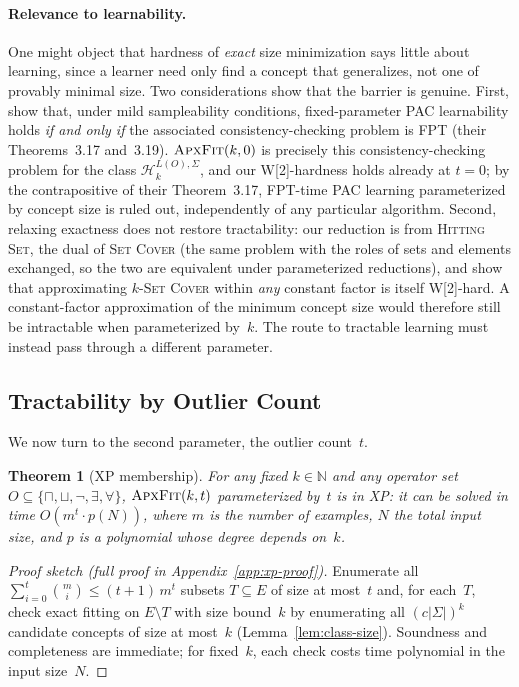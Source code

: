 \documentclass[accepted]{uai2026} %
\newtheorem{theorem}{Theorem}[section]
\theoremstyle{definition}
\theoremstyle{remark}
\newcommand{\AF}{\textsc{ApxFit}}
\begin{document}
\paragraph{Relevance to learnability.}
One might object that hardness of \emph{exact} size minimization
says little about learning, since a learner need only find a
concept that generalizes, not one of provably minimal size.
Two considerations show that the barrier is genuine.
First, \citet{DBLP:conf/aaai/BrandGS23} show
that, under mild sampleability conditions, fixed-parameter PAC
learnability holds \emph{if and only if} the associated consistency-checking problem is
FPT (their Theorems~3.17 and~3.19). $\AF(k,0)$ is precisely this
consistency-checking problem for the class
$\mathcal{H}_k^{L(O),\Sigma}$, and our W[2]-hardness holds already
at $t = 0$; by the contrapositive of their Theorem~3.17, FPT-time PAC
learning parameterized by concept size is ruled out, independently
of any particular algorithm.
Second, relaxing exactness does not restore tractability: our
reduction is from \textsc{Hitting Set}, the
dual of \textsc{Set Cover} (the same problem with the roles of
sets and elements exchanged, so the two are equivalent under
parameterized reductions), and \citet{DBLP:conf/soda/LinRSW23} show that
approximating $k$-\textsc{Set Cover} within \emph{any} constant
factor is itself W[2]-hard. A constant-factor approximation of the
minimum concept size would therefore still be intractable when
parameterized by~$k$. The route to tractable learning must
instead pass through a different parameter.

\subsection{Tractability by Outlier Count}\label{sec:complexity:xp}

We now turn to the second parameter, the
outlier count~$t$.

\begin{theorem}[XP membership]\label{thm:xp}  For any fixed $k \in \mathbb{N}$ and any operator
  set~$O \subseteq \{\sqcap, \sqcup, \neg,
  \exists, \forall\}$, $\AF(k,t)$ parameterized by~$t$ is in
  \textnormal{XP}: it can be solved in time
  $O(m^t \cdot p(N))$, where $m$
  is the number of examples, $N$ the total input size, and $p$ is a polynomial whose
  degree depends on~$k$.
\end{theorem}

\begin{proof}[Proof sketch
  (full proof in Appendix~\ref{app:xp-proof})]
  Enumerate all
  $\sum_{i=0}^{t}\binom{m}{i} \leq (t{+}1)\, m^t$ subsets
  $T \subseteq E$ of size at most~$t$ and, for each~$T$, check
  exact fitting on $E \setminus T$ with size bound~$k$ by
  enumerating all
  $(c|\Sigma|)^k$ candidate concepts of size at
  most~$k$ (Lemma~\ref{lem:class-size}). Soundness and
  completeness are immediate; for fixed~$k$, each check costs
  time polynomial in the input size~$N$.
\end{proof}
\end{document}
